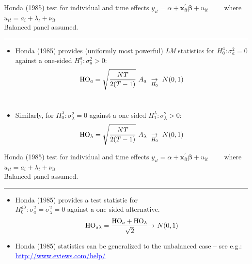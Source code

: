 \documentclass[usenames,dvipsnames]{beamer}
\begin{document}
\begin{frame}{Honda (1985) test for individual and time effects}
$y_{it} = \alpha + \bm{x}^{\prime}_{it} \bm{\beta} + u_{it} \qquad$    where $u_{it}=a_i + \lambda_t + \nu_{it} \qquad$ \\Balanced panel assumed.\\ \vspace{0.3cm} \hrule \medskip
\begin{itemize}
    \item Honda (1985) provides (uniformly most powerful) {\it LM} statistics for $H_0^{a}: \sigma_{a}^2=0$ against a one-sided $H_1^{a}: \sigma_{a}^2>0$:
    $$
    \textnormal{HO}_{a} = \sqrt{\frac{NT}{2(T-1)}} ~ A_{a} ~ \underset{H_0}{\rightarrow}~N(0,1)
    $$ \\ \medskip
    \item Similarly, for $H_0^{\lambda}: \sigma_{\lambda}^2=0$ against a one-sided $H_1^{\lambda}: \sigma_{\lambda}^2>0$:
    $$
    \textnormal{HO}_{\lambda} = \sqrt{\frac{NT}{2(T-1)}} ~ A_{\lambda} ~ \underset{H_0}{\rightarrow}~N(0,1)
    $$
\end{itemize}    
\end{frame}
\begin{frame}{Honda (1985) test for individual and time effects}
$y_{it} = \alpha + \bm{x}^{\prime}_{it} \bm{\beta} + u_{it} \qquad$    where $u_{it}=a_i + \lambda_t + \nu_{it} \qquad$ \\Balanced panel assumed.\\ \vspace{0.3cm} \hrule \medskip
\begin{itemize}
    \item Honda (1985) provides a test statistic for\\ \vspace{0.3cm} $H_0^{a \lambda}: \sigma_{a}^2=\sigma_{\lambda}^2=0$ against a one-sided alternative.\\ \medskip
    $$
    \textnormal{HO}_{a \lambda} = \frac{\textnormal{HO}_{a}+\textnormal{HO}_{\lambda}}{\sqrt{2}} {\rightarrow}~N(0,1)
    $$
    \medskip
    \item Honda (1985) statistics can be generalized to the unbalanced case -- see e.g.: \footnotesize{\textcolor{blue}{\underline{http://www.eviews.com/help/}}}
\end{itemize}    
\end{frame}
\end{document}
